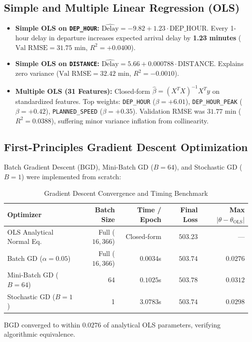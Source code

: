 \documentclass[11pt,a4paper]{article}
\begin{document}
\subsection{Simple and Multiple Linear Regression (OLS)}
\begin{itemize}[noitemsep]
    \item \textbf{Simple OLS on \texttt{DEP\_HOUR}:} $\widehat{\text{Delay}} = -9.82 + 1.23 \cdot \text{DEP\_HOUR}$. Every 1-hour delay in departure increases expected arrival delay by \textbf{1.23 minutes} ($\text{Val RMSE} = 31.75$ min, $R^2 = +0.0400$).
    \item \textbf{Simple OLS on \texttt{DISTANCE}:} $\widehat{\text{Delay}} = 5.66 + 0.000788 \cdot \text{DISTANCE}$. Explains zero variance ($\text{Val RMSE} = 32.42$ min, $R^2 = -0.0010$).
    \item \textbf{Multiple OLS (31 Features):} Closed-form $\hat{\beta} = (X^T X)^{-1} X^T y$ on standardized features. Top weights: \texttt{DEP\_HOUR} ($\beta = +6.01$), \texttt{DEP\_HOUR\_PEAK} ($\beta = +0.42$), \texttt{PLANNED\_SPEED} ($\beta = +0.35$). Validation RMSE was $31.77$ min ($R^2 = 0.0388$), suffering minor variance inflation from collinearity.
\end{itemize}

\subsection{First-Principles Gradient Descent Optimization}
Batch Gradient Descent (BGD), Mini-Batch GD ($B = 64$), and Stochastic GD ($B = 1$) were implemented from scratch:
\begin{table}[H]
\centering
\small
\caption{Gradient Descent Convergence and Timing Benchmark}
\label{tab:gd_benchmark}
\begin{tabular}{lrrrr}
\toprule
\textbf{Optimizer} & \textbf{Batch Size} & \textbf{Time / Epoch} & \textbf{Final Loss} & \textbf{Max $|\theta - \theta_{\text{OLS}}|$} \\
\midrule
OLS Analytical Normal Eq. & Full ($16,366$) & Closed-form & $503.23$ & --- \\
Batch GD ($\alpha = 0.05$) & Full ($16,366$) & $0.0034$s & $503.74$ & $0.0276$ \\
Mini-Batch GD ($B = 64$) & 64 & $0.1025$s & $503.78$ & $0.0312$ \\
Stochastic GD ($B = 1$) & 1 & $3.0783$s & $503.74$ & $0.0298$ \\
\bottomrule
\end{tabular}
\end{table}
BGD converged to within $0.0276$ of analytical OLS parameters, verifying algorithmic equivalence.
\end{document}
